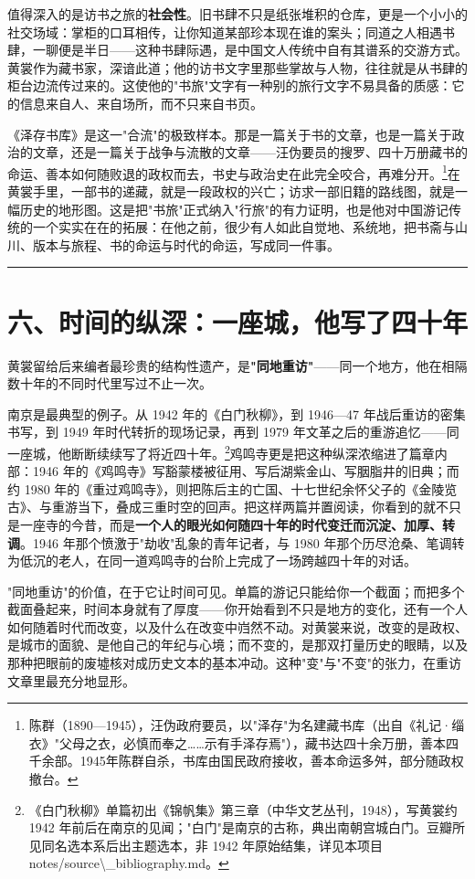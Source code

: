 \documentclass[UTF8,fontset=none,zihao=-4,a4paper]{ctexart}
\begin{document}
值得深入的是访书之旅的\textbf{社会性}。旧书肆不只是纸张堆积的仓库，更是一个小小的社交场域：掌柜的口耳相传，让你知道某部珍本现在谁的案头；同道之人相遇书肆，一聊便是半日——这种书肆际遇，是中国文人传统中自有其谱系的交游方式。黄裳作为藏书家，深谙此道；他的访书文字里那些掌故与人物，往往就是从书肆的柜台边流传过来的。这使他的"书旅"文字有一种别的旅行文字不易具备的质感：它的信息来自人、来自场所，而不只来自书页。


《泽存书库》是这一"合流"的极致样本。那是一篇关于书的文章，也是一篇关于政治的文章，还是一篇关于战争与流散的文章——汪伪要员的搜罗、四十万册藏书的命运、善本如何随败退的政权而去，书史与政治史在此完全咬合，再难分开。\footnote{陈群（1890—1945），汪伪政府要员，以"泽存"为名建藏书库（出自《礼记·缁衣》"父母之衣，必慎而奉之……示有手泽存焉"），藏书达四十余万册，善本四千余部。1945年陈群自杀，书库由国民政府接收，善本命运多舛，部分随政权撤台。}在黄裳手里，一部书的递藏，就是一段政权的兴亡；访求一部旧籍的路线图，就是一幅历史的地形图。这是把"书旅"正式纳入"行旅"的有力证明，也是他对中国游记传统的一个实实在在的拓展：在他之前，很少有人如此自觉地、系统地，把书斋与山川、版本与旅程、书的命运与时代的命运，写成同一件事。


\medskip\hrule\medskip

\section{六、时间的纵深：一座城，他写了四十年}


黄裳留给后来编者最珍贵的结构性遗产，是\textbf{"同地重访"}——同一个地方，他在相隔数十年的不同时代里写过不止一次。


南京是最典型的例子。从 1942 年的《白门秋柳》，到 1946—47 年战后重访的密集书写，到 1949 年时代转折的现场记录，再到 1979 年文革之后的重游追忆——同一座城，他断断续续写了将近四十年。\footnote{《白门秋柳》单篇初出《锦帆集》第三章（中华文艺丛刊，1948），写黄裳约 1942 年前后在南京的见闻；"白门"是南京的古称，典出南朝宫城白门。豆瓣所见同名选本系后出主题选本，非 1942 年原始结集，详见本项目 notes/source\textbackslash{}\_bibliography.md。}鸡鸣寺更是把这种纵深浓缩进了篇章内部：1946 年的《鸡鸣寺》写豁蒙楼被征用、写后湖紫金山、写胭脂井的旧典；而约 1980 年的《重过鸡鸣寺》，则把陈后主的亡国、十七世纪余怀父子的《金陵览古》、与重游当下，叠成三重时空的回声。把这样两篇并置阅读，你看到的就不只是一座寺的今昔，而是\textbf{一个人的眼光如何随四十年的时代变迁而沉淀、加厚、转调}。1946 年那个愤激于"劫收"乱象的青年记者，与 1980 年那个历尽沧桑、笔调转为低沉的老人，在同一道鸡鸣寺的台阶上完成了一场跨越四十年的对话。


"同地重访"的价值，在于它让时间可见。单篇的游记只能给你一个截面；而把多个截面叠起来，时间本身就有了厚度——你开始看到不只是地方的变化，还有一个人如何随着时代而改变，以及什么在改变中岿然不动。对黄裳来说，改变的是政权、是城市的面貌、是他自己的年纪与心境；而不变的，是那双打量历史的眼睛，以及那种把眼前的废墟核对成历史文本的基本冲动。这种"变"与"不变"的张力，在重访文章里最充分地显形。
\end{document}
